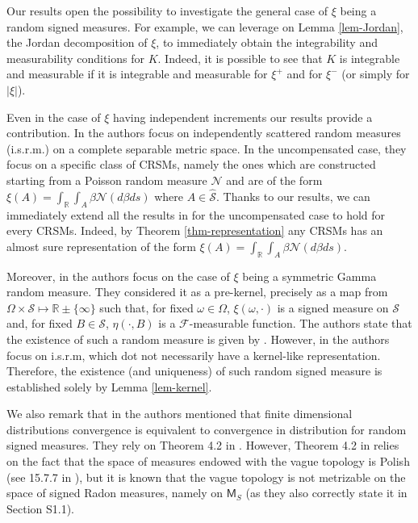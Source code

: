 \documentclass{article}
\theoremstyle{plain}
\theoremstyle{remark}
\begin{document}
Our results open the possibility to investigate the general case of $\xi$ being a random signed measures. For example, we can leverage on Lemma \ref{lem-Jordan}, the Jordan decomposition of $\xi$, to immediately obtain the integrability and measurability conditions for $K$. Indeed, it is possible to see that $K$ is integrable and measurable if it is integrable and measurable for $\xi^+$ and for $\xi^-$ (or simply for $|\xi|$).

Even in the case of $\xi$ having independent increments our results provide a contribution. In \citet{Wolpert} the authors focus on independently scattered random measures (i.s.r.m.) on a complete separable metric space. In the uncompensated case, they focus on a specific class of CRSMs, namely the ones which are constructed starting from a Poisson random measure $\mathcal{N}$ and are of the form $\xi(A)=\int_{\mathbb{R}}\int_A \beta \mathcal{N}(d\beta ds)$ where $A\in\hat{\mathcal{S}}$. Thanks to our results, we can immediately extend all the results in \citet{Wolpert} for the uncompensated case to hold for every CRSMs. Indeed, by Theorem \ref{thm-representation} any CRSMs has an almost sure representation of the form $\xi(A)=\int_{\mathbb{R}}\int_A \beta \mathcal{N}(d\beta ds)$.

Moreover, in \citet{Naulet} the authors focus on the case of $\xi$ being a symmetric Gamma random measure. They considered it as a pre-kernel, precisely as a map from $\Omega\times \mathcal{S}\mapsto \mathbb{R}\pm\{\infty\}$ such that, for fixed $\omega\in\Omega$, $\xi(\omega,\cdot)$ is a signed measure on $\mathcal{S}$ and, for fixed $B\in\mathcal{S}$, $\eta(\cdot, B)$ is a $\mathcal{F}$-measurable function. The authors state that the existence of such a random measure is given by \citet{RajRos}. However, in \citet{RajRos} the authors focus on i.s.r.m, which dot not necessarily have a kernel-like representation. Therefore, the existence (and uniqueness) of such random signed measure is established solely by Lemma \ref{lem-kernel}.

We also remark that in \citet{Naulet} the authors mentioned that finite dimensional distributions convergence is equivalent to convergence in distribution for random signed measures. They rely on Theorem 4.2 in \citet{Kallenberg0}. However, Theorem 4.2 in \citet{Kallenberg0} relies on the fact that the space of measures endowed with the vague topology is Polish (see 15.7.7 in \citet{Kallenberg0}), but it is known that the vague topology is not metrizable on the space of signed Radon measures, namely on $\mathsf{M}_{S}$ (as they also correctly state it in Section S1.1). 
\end{document}
